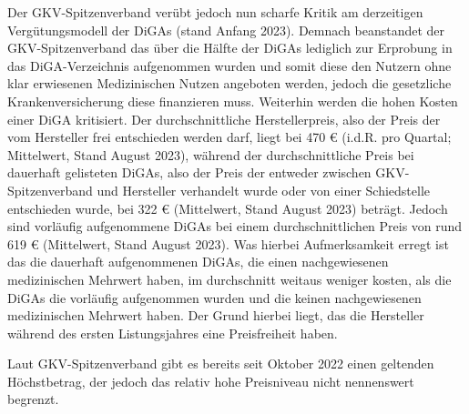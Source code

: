 \documentclass{article}
\begin{document}
			Der GKV-Spitzenverband verübt jedoch nun scharfe Kritik am derzeitigen Vergütungsmodell der DiGAs (stand Anfang 2023). Demnach beanstandet der GKV-Spitzenverband das über die Hälfte der DiGAs lediglich zur Erprobung in das DiGA-Verzeichnis aufgenommen wurden und somit diese den Nutzern ohne klar erwiesenen Medizinischen Nutzen angeboten werden, jedoch die gesetzliche Krankenversicherung diese finanzieren muss. Weiterhin werden die hohen Kosten einer DiGA kritisiert. Der durchschnittliche Herstellerpreis, also der Preis der vom Hersteller frei entschieden werden darf, liegt bei 470 € (i.d.R. pro Quartal; Mittelwert, Stand August 2023), während der durchschnittliche Preis bei dauerhaft gelisteten DiGAs, also der Preis der entweder zwischen GKV-Spitzenverband und Hersteller verhandelt wurde oder von einer Schiedstelle entschieden wurde, bei 322 € (Mittelwert, Stand August 2023) beträgt. Jedoch sind vorläufig aufgenommene DiGAs bei einem durchschnittlichen Preis von rund 619 € (Mittelwert, Stand August 2023). Was hierbei Aufmerksamkeit erregt ist das die dauerhaft aufgenommenen DiGAs, die einen nachgewiesenen medizinischen Mehrwert haben, im durchschnitt weitaus weniger kosten, als die DiGAs die vorläufig aufgenommen wurden und die keinen nachgewiesenen medizinischen Mehrwert haben. Der Grund hierbei liegt, das die Hersteller während des ersten Listungsjahres eine Preisfreiheit haben.\par    
			Laut GKV-Spitzenverband gibt es bereits seit Oktober 2022 einen geltenden Höchstbetrag, der jedoch das relativ hohe Preisniveau nicht nennenswert begrenzt. 	     
\end{document}
